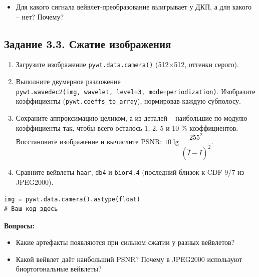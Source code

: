 \documentclass[12pt,a4paper,openany]{book}
\providecommand{\tightlist}{\setlength{\itemsep}{0pt}\setlength{\parskip}{0pt}}
\begin{document}
\begin{itemize}
\tightlist
\item
  Для какого сигнала вейвлет-преобразование выигрывает у ДКП, а для какого -- нет? Почему?
\end{itemize}

\subsection*{Задание 3.3. Сжатие изображения}

\begin{enumerate}
\def\labelenumi{\arabic{enumi}.}
\tightlist
\item
  Загрузите изображение \texttt{pywt.\allowbreak{}data.\allowbreak{}camera(\allowbreak{})} (512×512, оттенки серого).
\item
  Выполните двумерное разложение \texttt{pywt.\allowbreak{}wavedec2(\allowbreak{}img,\allowbreak{}\ wavelet,\allowbreak{}\ level=\allowbreak{}3,\allowbreak{}\ mode=\allowbreak{}\textquotesingle{}\allowbreak{}periodization\textquotesingle{}\allowbreak{})}. Изобразите коэффициенты (\texttt{pywt.\allowbreak{}coeffs\_\allowbreak{}to\_\allowbreak{}array}), нормировав каждую субполосу.
\item
  Сохраните аппроксимацию целиком, а из деталей -- наибольшие по модулю коэффициенты так, чтобы всего осталось 1, 2, 5 и 10 \% коэффициентов. Восстановите изображение и вычислите PSNR: \(10\lg\dfrac{255^2}{\overline{(\hat I - I)^2}}\).
\item
  Сравните вейвлеты \texttt{haar}, \texttt{db4} и \texttt{bior4.\allowbreak{}4} (последний близок к CDF 9/7 из JPEG2000).
\end{enumerate}

\begin{Verbatim}[fontsize=\small, breaklines, breakanywhere, frame=single, framesep=2mm]
img = pywt.data.camera().astype(float)
# Ваш код здесь
\end{Verbatim}

\textbf{Вопросы:}

\begin{itemize}
\tightlist
\item
  Какие артефакты появляются при сильном сжатии у разных вейвлетов?
\item
  Какой вейвлет даёт наибольший PSNR? Почему в JPEG2000 используют биортогональные вейвлеты?
\end{itemize}
\end{document}
